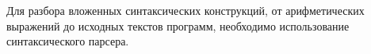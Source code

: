 \label{parser}\secdown

Для разбора вложенных синтаксических конструкций, от арифметических
выражений до исходных текстов программ, необходимо использование 
синтаксического парсера.



\secup